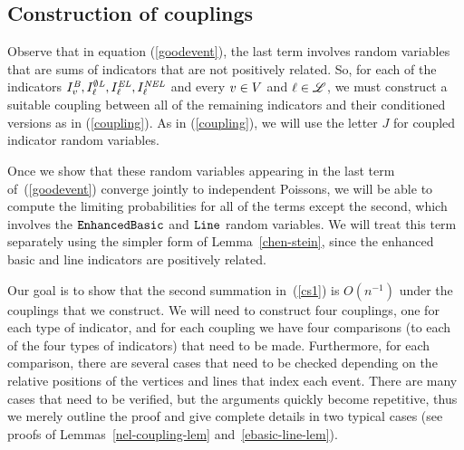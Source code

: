 \subsection*{Construction of couplings}
Observe that in equation (\ref{goodevent}), the last term involves random variables that are sums of indicators that are not positively related.  So, for each of the indicators $I^{\text{\em B}}_{{ v}}, I^{\emptyset\text{\em L}}_\ell, I^{\text{\em EL}}_{\ell}, I^{\text{\em NEL}}_{\ell}$ and every ${ v}\in V$ and $\ell \in \mathscr{L}$, we must construct a suitable coupling between all of the remaining indicators and their conditioned versions as in (\ref{coupling}).  As in (\ref{coupling}), we will use the letter $J$ for coupled indicator random variables.

Once we show that these random variables appearing in the last term of~(\ref{goodevent}) converge jointly to independent Poissons, we will be able to compute the limiting probabilities for all of the terms except the second, which involves the $\operatorname{\tt Enhanced Basic}$ and $\operatorname{\tt Line}$ random variables.  We will treat this term separately using the simpler form of Lemma~\ref{chen-stein}, since the enhanced basic and line indicators are positively related.

Our goal is to show that the second summation in~(\ref{cs1}) is $O(n^{-1})$ under the couplings that we construct.  We will need to construct four couplings, one for each type of indicator, and for each coupling we have four comparisons (to each of the four types of indicators) that need to be made.  Furthermore, for each comparison, there are several cases that need to be checked depending on the relative positions of the vertices and lines that index each event.  There are many cases that need to be verified, but the arguments quickly become repetitive, thus we merely outline the proof and give complete details in two typical cases (see proofs of Lemmas~\ref{nel-coupling-lem} and~\ref{ebasic-line-lem}).

